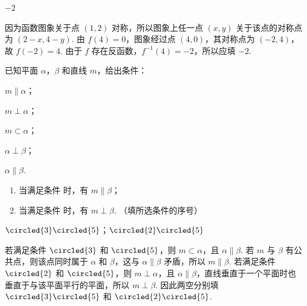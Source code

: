 \begin{answer}
\(-2\)
\end{answer}

\begin{solution}
因为函数图象关于点 \((1,2)\) 对称，所以图象上任一点 \((x,y)\) 关于该点的对称点为 \((2-x,4-y)\). 由 \(f(4)=0\)，图象经过点 \((4,0)\)，其对称点为 \((-2,4)\)，故 \(f(-2)=4\). 由于 \(f\) 存在反函数，\(f^{-1}(4)=-2\)，所以应填 \(-2\).
\end{solution}

\begin{problem}
已知平面 \(\alpha\)，\(\beta\) 和直线 \(m\)，给出条件：

\begin{circlelist}
\item \( m \parallel \alpha \)；
\item \( m \perp \alpha \)；
\item \( m \subset \alpha \)；
\item \( \alpha \perp \beta \)；
\item \( \alpha \parallel \beta \).
\end{circlelist}

\begin{enumerate}
\item 当满足条件\fillinblank{} 时，有 \( m \parallel \beta \)；
\item 当满足条件\fillinblank{} 时，有 \( m \perp \beta \). （填所选条件的序号）
\end{enumerate}
\end{problem}

\begin{answer}
\(\circled{3}\circled{5}\)；\(\circled{2}\circled{5}\)
\end{answer}

\begin{solution}
若满足条件 \(\circled{3}\) 和 \(\circled{5}\)，则 \(m\subset\alpha\)，且 \(\alpha\parallel\beta\). 若 \(m\) 与 \(\beta\) 有公共点，则该点同时属于 \(\alpha\) 和 \(\beta\)，这与 \(\alpha\parallel\beta\) 矛盾，所以 \(m\parallel\beta\). 若满足条件 \(\circled{2}\) 和 \(\circled{5}\)，则 \(m\perp\alpha\)，且 \(\alpha\parallel\beta\)，直线垂直于一个平面时也垂直于与该平面平行的平面，所以 \(m\perp\beta\). 因此两空分别填 \(\circled{3}\circled{5}\) 和 \(\circled{2}\circled{5}\).
\end{solution}

